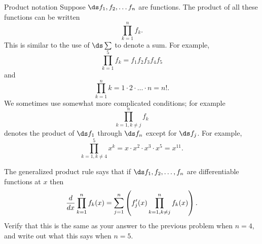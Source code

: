 \begin{exercises}
\begin{remark}{Product notation}
Suppose $\ds f_1 , f_2 , \ldots f_n$ are functions.
The product of all these functions can be written
$$ \prod _{k=1 } ^n f_k.$$
This is similar to the use of $\ds \sum$ to denote a 
sum.
For example,
$$\prod _{k=1 } ^5 f_k =f_1 f_2 f_3 f_4 f_5$$
and
$$
\prod _ {k=1 } ^n k = 1\cdot 2 \cdot \ldots \cdot n = n!.$$
We sometimes use somewhat more complicated conditions; for example
$$\prod _{k=1 , k\neq j } ^n f_k$$
denotes the product of $\ds f_1$ through $\ds f_n$ except for $\ds f_j$.
For example, 
$$\prod _{k=1 , k\neq 4} ^5 x^k = x\cdot x^2 \cdot x^3 \cdot x^5 =
x^{11}.$$
\end{remark}

\begin{exercise}
  The {\dfont generalized product rule\/} 
says that if $\ds f_1 , f_2 ,\ldots ,f_n$ are differentiable functions at
  $x$ then
$${d\over dx}\prod _{k=1 } ^n f_k(x) = 
\sum _{j=1 } ^n \left(f'_j (x) \prod _{k=1 , k\neq j} ^n
   f_k (x)\right).$$
Verify that this is the same as your answer to the previous problem
when $n=4$,
and write out what this says when $n=5$.
\end{exercise}


\end{exercises}

